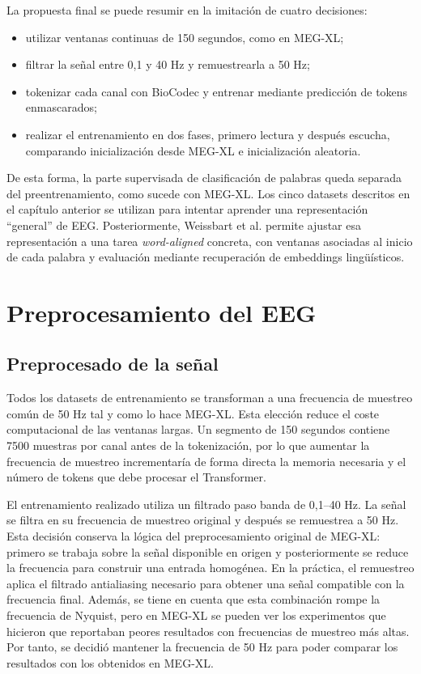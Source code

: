 La propuesta final se puede resumir en la imitación de cuatro decisiones:

\begin{itemize}
\setlength{\itemsep}{0pt}
\setlength{\parsep}{0pt}
\setlength{\topsep}{2pt}
\setlength{\partopsep}{0pt}
\item utilizar ventanas continuas de 150 segundos, como en MEG-XL;
\item filtrar la señal entre 0,1 y 40 Hz y remuestrearla a 50 Hz;
\item tokenizar cada canal con BioCodec y entrenar mediante predicción de tokens enmascarados;
\item realizar el entrenamiento en dos fases, primero lectura y después escucha, comparando inicialización desde MEG-XL e inicialización aleatoria.
\end{itemize}

De esta forma, la parte supervisada de clasificación de palabras queda separada del preentrenamiento, como sucede con MEG-XL. Los cinco datasets descritos en el capítulo anterior se utilizan para intentar aprender una representación ``general'' de EEG. Posteriormente, Weissbart et al. permite ajustar esa representación a una tarea \textit{word-aligned} concreta, con ventanas asociadas al inicio de cada palabra y evaluación mediante recuperación de embeddings lingüísticos.

\section{Preprocesamiento del EEG}

\subsection{Preprocesado de la señal}

Todos los datasets de entrenamiento se transforman a una frecuencia de muestreo común de 50 Hz tal y como lo hace MEG-XL. Esta elección reduce el coste computacional de las ventanas largas. Un segmento de 150 segundos contiene 7500 muestras por canal antes de la tokenización, por lo que aumentar la frecuencia de muestreo incrementaría de forma directa la memoria necesaria y el número de tokens que debe procesar el Transformer.

El entrenamiento realizado utiliza un filtrado paso banda de 0,1--40 Hz. La señal se filtra en su frecuencia de muestreo original y después se remuestrea a 50 Hz. Esta decisión conserva la lógica del preprocesamiento original de MEG-XL: primero se trabaja sobre la señal disponible en origen y posteriormente se reduce la frecuencia para construir una entrada homogénea. En la práctica, el remuestreo aplica el filtrado antialiasing necesario para obtener una señal compatible con la frecuencia final. Además, se tiene en cuenta que esta combinación rompe la frecuencia de Nyquist, pero en MEG-XL \cite{dascoli2023megxl} se pueden ver los experimentos que hicieron que reportaban peores resultados con frecuencias de muestreo más altas. Por tanto, se decidió mantener la frecuencia de 50 Hz para poder comparar los resultados con los obtenidos en MEG-XL.

